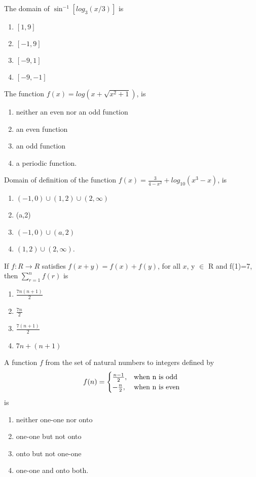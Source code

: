 \item The domain of $\sin^{-1}[log_3(x/3)]$ is
\begin{enumerate}
\item $[1,9]$
\item $[-1,9]$
\item $[-9,1]$
\item $[-9,-1]$
\end{enumerate}

\item The function $f(x)=log(x+\sqrt{x^{2}+1})$, is
\begin{enumerate}
\item neither an even nor an odd function
\item an even function
\item an odd function
\item a periodic function.
\end{enumerate}

\item Domain of definition of the function $f(x)=\frac{3}{4-x^{2}}+log_{10}(x^{3}-x)$, is
\begin{enumerate}
\item $(-1,0) \cup (1,2) \cup (2,\infty)$
\item (a,2)
\item $(-1,0) \cup (a,2)$
\item $(1,2) \cup (2,\infty)$.
\end{enumerate}

\item If $f: R \rightarrow R$ satisfies $f(x+y)=f(x)+f(y)$, for all $x$, y $\in$ R and f(1)=7, then 
$\sum_{r=1}^{n} f(r)$ is
\begin{enumerate}
\item $\frac{7n(n+1)}{2}$
\item $\frac{7n}{2}$
\item $\frac{7(n+1)}{2}$
\item $7n+(n+1)$
\end{enumerate}

\item A function $f$ from the set of natural numbers to integers defined by \[f(n)=\begin{cases} 
       \frac{n-1}{2}, & $when n is odd$\\
       -\frac{n}{2}, & $when n is even$\\
   \end{cases}\] is
\begin{enumerate}
\item neither one-one nor onto
\item one-one but not onto
\item onto but not one-one
\item one-one and onto both.
\end{enumerate}
    
